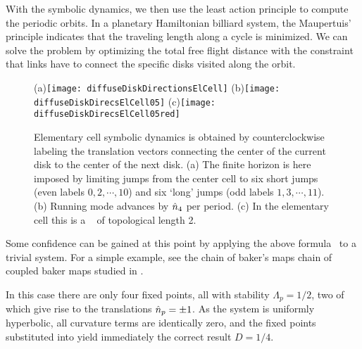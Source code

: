 With the symbolic dynamics, we then use the least action principle to
compute the periodic orbits. In a planetary Hamiltonian
billiard system, the Maupertuis' principle indicates that the
traveling length along a cycle is minimized. We can solve the problem
by optimizing the total free flight distance with the constraint that
links have to connect the specific disks visited along the orbit.

\begin{figure}
  \begin{center}
    (a)\texttt{[image: diffuseDiskDirectionsElCell]}
    (b)\texttt{[image: diffuseDiskDirecsElCell05]}
    (c)\texttt{[image: diffuseDiskDirecsElCell05red]}
  \end{center}
  \caption{\label{fig-diskDirectionsElCell}
  Elementary cell symbolic dynamics is obtained by counterclockwise
  labeling the translation vectors connecting the center of the current
  disk to the center of  the next disk. (a) The finite horizon is here
  imposed by limiting jumps from  the center cell to six short jumps
  (even labels $0, 2,\cdots,10$) and six `long' jumps (odd labels $1,
  3,\cdots,11$). (b) Running mode   advances by $\hat{n}_4$ per
  period. (c) In the elementary cell this is  a \po\  of
  topological length 2.
  }
\end{figure}

Some confidence can be gained at this point by applying the above
formula~ to a trivial system. For a simple example,
see the chain of baker's maps chain of coupled baker maps studied in
.

In this case there are only four fixed points, all with stability
$\Lambda_p=1/2$, two of which give rise to the translations
$\hat{n}_{p}=\pm 1$. As the system is uniformly hyperbolic, all curvature
terms are identically zero, and the fixed points substituted into
 yield immediately the correct result $D=1/4$.
